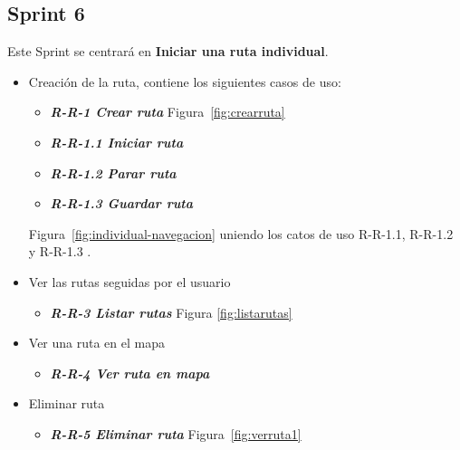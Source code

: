 \subsection{Sprint 6}
Este Sprint se centrará en \textbf{Iniciar una ruta individual}.

\begin{itemize}
\item Creación de la ruta, contiene los siguientes casos de uso:

\begin{itemize}
\item \textbf{\textit{R-R-1 Crear ruta}} Figura~\ref{fig:crearruta}
\item \textbf{\textit{R-R-1.1 Iniciar ruta}}
\item\textbf{ \textit{R-R-1.2 Parar ruta}}
\item \textbf{\textit{R-R-1.3 Guardar ruta}} 
\end{itemize}
Figura~\ref{fig:individual-navegacion} uniendo los catos de uso R-R-1.1, R-R-1.2 y R-R-1.3 .
\item Ver las rutas seguidas por el usuario

\begin{itemize}
\item \textbf{\textit{R-R-3 Listar rutas} } Figura \ref{fig:listarutas}

\end{itemize}
\item Ver una ruta en el mapa 

\begin{itemize}
\item \textbf{\textit{R-R-4 Ver ruta en mapa}}

\end{itemize}
\item Eliminar ruta

\begin{itemize}
\item \textbf{\textit{R-R-5 Eliminar ruta}} Figura~\ref{fig:verruta1}

\end{itemize}

\end{itemize}








